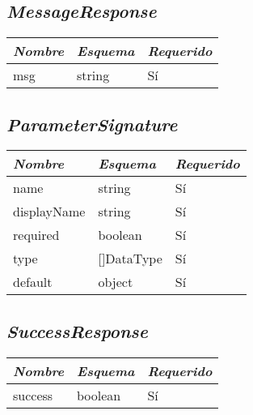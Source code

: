 \subsection{\textit{MessageResponse}}
\begin{table}[H]
    \centering
    \def\arraystretch{1.25}
    \begin{adjustbox}{max width=\textwidth}
    \begin{tabularx}{\textwidth}{|L|l|l|}
    \hline
        \textbf{\textit{Nombre}} & \textbf{\textit{Esquema}} & \textbf{\textit{Requerido}} \\ \hline
    \hline
    	msg & string & Sí \\ \hline
    \end{tabularx}
    \end{adjustbox}
\end{table}

\subsection{\textit{ParameterSignature}}
\begin{table}[H]
    \centering
    \def\arraystretch{1.25}
    \begin{adjustbox}{max width=\textwidth}
    \begin{tabularx}{\textwidth}{|L|l|l|}
    \hline
        \textbf{\textit{Nombre}} & \textbf{\textit{Esquema}} & \textbf{\textit{Requerido}} \\ \hline
    \hline
        name & string & Sí \\ \hline
        displayName & string & Sí \\ \hline
        required & boolean & Sí \\ \hline
        type & []DataType & Sí \\ \hline
        default & object & Sí \\ \hline
    \end{tabularx}
    \end{adjustbox}
\end{table}

\subsection{\textit{SuccessResponse}}
\begin{table}[H]
    \centering
    \def\arraystretch{1.25}
    \begin{adjustbox}{max width=\textwidth}
    \begin{tabularx}{\textwidth}{|L|l|l|}
    \hline
        \textbf{\textit{Nombre}} & \textbf{\textit{Esquema}} & \textbf{\textit{Requerido}} \\ \hline
    \hline
    	success & boolean & Sí \\ \hline
    \end{tabularx}
    \end{adjustbox}
\end{table}

